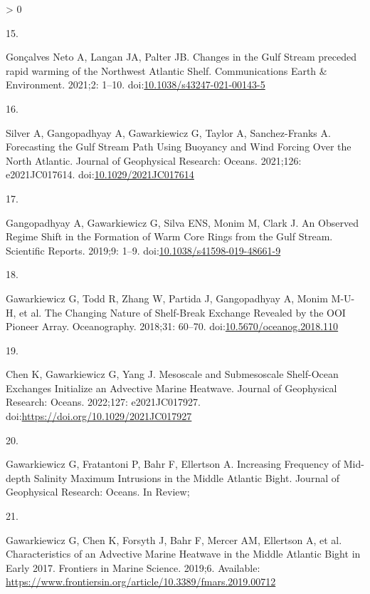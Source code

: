 \documentclass[
  10pt,
]{article}
\newlength{\cslhangindent}
\newlength{\csllabelwidth}
\newenvironment{CSLReferences}[2] %
 {%
  \setlength{\parindent}{0pt}
  \ifodd #1 \everypar{\setlength{\hangindent}{\cslhangindent}}\ignorespaces\fi
  \ifnum #2 > 0
  \setlength{\parskip}{#2\baselineskip}
  \fi
 }%
 {}
\newcommand{\CSLLeftMargin}[1]{\parbox[t]{\csllabelwidth}{#1}}
\newcommand{\CSLRightInline}[1]{\parbox[t]{\linewidth - \csllabelwidth}{#1}\break}
\begin{document}
\begin{CSLReferences}{0}{0}
\leavevmode\hypertarget{ref-goncalves_neto_changes_2021}{}%
\CSLLeftMargin{15. }
\CSLRightInline{Gonçalves Neto A, Langan JA, Palter JB. Changes in the
{Gulf} {Stream} preceded rapid warming of the {Northwest} {Atlantic}
{Shelf}. Communications Earth \& Environment. 2021;2: 1--10.
doi:\href{https://doi.org/10.1038/s43247-021-00143-5}{10.1038/s43247-021-00143-5}}

\leavevmode\hypertarget{ref-silver_forecasting_2021}{}%
\CSLLeftMargin{16. }
\CSLRightInline{Silver A, Gangopadhyay A, Gawarkiewicz G, Taylor A,
Sanchez-Franks A. Forecasting the {Gulf} {Stream} {Path} {Using}
{Buoyancy} and {Wind} {Forcing} {Over} the {North} {Atlantic}. Journal
of Geophysical Research: Oceans. 2021;126: e2021JC017614.
doi:\href{https://doi.org/10.1029/2021JC017614}{10.1029/2021JC017614}}

\leavevmode\hypertarget{ref-gangopadhyay_observed_2019}{}%
\CSLLeftMargin{17. }
\CSLRightInline{Gangopadhyay A, Gawarkiewicz G, Silva ENS, Monim M,
Clark J. An {Observed} {Regime} {Shift} in the {Formation} of {Warm}
{Core} {Rings} from the {Gulf} {Stream}. Scientific Reports. 2019;9:
1--9.
doi:\href{https://doi.org/10.1038/s41598-019-48661-9}{10.1038/s41598-019-48661-9}}

\leavevmode\hypertarget{ref-gawarkiewicz_changing_2018}{}%
\CSLLeftMargin{18. }
\CSLRightInline{Gawarkiewicz G, Todd R, Zhang W, Partida J, Gangopadhyay
A, Monim M-U-H, et al. The {Changing} {Nature} of {Shelf}-{Break}
{Exchange} {Revealed} by the {OOI} {Pioneer} {Array}. Oceanography.
2018;31: 60--70.
doi:\href{https://doi.org/10.5670/oceanog.2018.110}{10.5670/oceanog.2018.110}}

\leavevmode\hypertarget{ref-chen_mesoscale_2022}{}%
\CSLLeftMargin{19. }
\CSLRightInline{Chen K, Gawarkiewicz G, Yang J. Mesoscale and
{Submesoscale} {Shelf}-{Ocean} {Exchanges} {Initialize} an {Advective}
{Marine} {Heatwave}. Journal of Geophysical Research: Oceans. 2022;127:
e2021JC017927. doi:\url{https://doi.org/10.1029/2021JC017927}}

\leavevmode\hypertarget{ref-gawarkiewicz_increasing_nodate}{}%
\CSLLeftMargin{20. }
\CSLRightInline{Gawarkiewicz G, Fratantoni P, Bahr F, Ellertson A.
Increasing {Frequency} of {Mid}-depth {Salinity} {Maximum} {Intrusions}
in the {Middle} {Atlantic} {Bight}. Journal of Geophysical Research:
Oceans. In Review; }

\leavevmode\hypertarget{ref-gawarkiewicz_characteristics_2019}{}%
\CSLLeftMargin{21. }
\CSLRightInline{Gawarkiewicz G, Chen K, Forsyth J, Bahr F, Mercer AM,
Ellertson A, et al. Characteristics of an {Advective} {Marine}
{Heatwave} in the {Middle} {Atlantic} {Bight} in {Early} 2017. Frontiers
in Marine Science. 2019;6. Available:
\url{https://www.frontiersin.org/article/10.3389/fmars.2019.00712}}


\end{CSLReferences}
\end{document}
